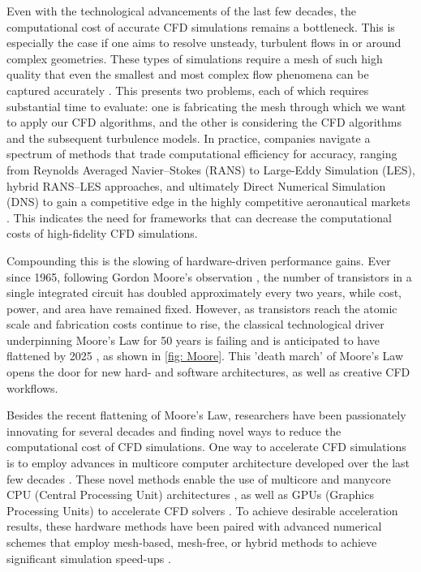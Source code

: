 Even with the technological advancements of the last few decades, the computational cost of accurate CFD simulations remains a bottleneck. This is especially the case if one aims to resolve unsteady, turbulent flows in or around complex geometries. These types of simulations require a mesh of such high quality that even the smallest and most complex flow phenomena can be captured accurately \cite{Spalart2000}. This presents two problems, each of which requires substantial time to evaluate: one is fabricating the mesh through which we want to apply our CFD algorithms, and the other is considering the CFD algorithms and the subsequent turbulence models. In practice, companies navigate a spectrum of methods that trade computational efficiency for accuracy, ranging from Reynolds Averaged Navier–Stokes (RANS) to Large-Eddy Simulation (LES), hybrid RANS–LES approaches, and ultimately Direct Numerical Simulation (DNS) to gain a competitive edge in the highly competitive aeronautical markets \cite{Spalart2000}. This indicates the need for frameworks that can decrease the computational costs of high-fidelity CFD simulations. 

Compounding this is the slowing of hardware-driven performance gains. Ever since 1965, following Gordon Moore's observation \cite{moore1965}, the number of transistors in a single integrated circuit has doubled approximately every two years, while cost, power, and area have remained fixed. However, as transistors reach the atomic scale and fabrication costs continue to rise, the classical technological driver underpinning Moore's Law for 50 years is failing and is anticipated to have flattened by 2025 \cite{Shalf2020}, as shown in \autoref{fig: Moore}. This 'death march' of Moore's Law \cite{Markov2014} opens the door for new hard- and software architectures, as well as creative CFD workflows. 

Besides the recent flattening of Moore's Law, researchers have been passionately innovating for several decades and finding novel ways to reduce the computational cost of CFD simulations. One way to accelerate CFD simulations is to employ advances in multicore computer architecture developed over the last few decades \cite{Hosain2015}. These novel methods enable the use of multicore and manycore CPU (Central Processing Unit) architectures \cite{Hadade2016}, as well as GPUs (Graphics Processing Units) to accelerate CFD solvers \cite{Xiang2017}. To achieve desirable acceleration results, these hardware methods have been paired with advanced numerical schemes that employ mesh-based, mesh-free, or hybrid methods to achieve significant simulation speed-ups \cite{Hosain2015}. 

